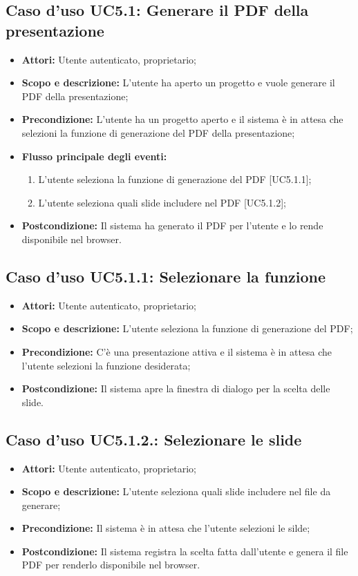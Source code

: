 	\subsection{Caso d'uso UC5.1: Generare il PDF della presentazione}
	\begin{itemize}
		\item \textbf{Attori:} Utente autenticato, proprietario;
		\item \textbf{Scopo e descrizione:} L'utente ha aperto un progetto e vuole generare il PDF della presentazione;
		\item \textbf{Precondizione:} L'utente ha un progetto aperto e il sistema è in attesa che selezioni la funzione di generazione del PDF della presentazione;
		\item \textbf{Flusso principale degli eventi:}
		\begin{enumerate}
			\item L'utente seleziona la funzione di generazione del PDF [UC5.1.1];
			\item L'utente seleziona quali slide includere nel PDF [UC5.1.2];
		\end{enumerate}
		\item \textbf{Postcondizione:} Il sistema ha generato il PDF per l'utente e lo rende disponibile nel browser.
	\end{itemize}
	
	
		\subsection{Caso d'uso UC5.1.1: Selezionare la funzione}
		\begin{itemize}
			\item \textbf{Attori:} Utente autenticato, proprietario;
			\item \textbf{Scopo e descrizione:} L'utente seleziona la funzione di generazione del PDF;
			\item \textbf{Precondizione:} C'è una presentazione attiva e il sistema è in attesa che l'utente selezioni la funzione desiderata;
			\item \textbf{Postcondizione:} Il sistema apre la finestra di dialogo per la scelta delle slide.
		\end{itemize}
		
		\subsection{Caso d'uso UC5.1.2.: Selezionare le slide}
		\begin{itemize}
			\item \textbf{Attori:} Utente autenticato, proprietario;
			\item \textbf{Scopo e descrizione:} L'utente seleziona quali slide includere nel file da generare;
			\item \textbf{Precondizione:} Il sistema è in attesa che l'utente selezioni le silde;
			\item \textbf{Postcondizione:} Il sistema registra la scelta fatta dall'utente e genera il file PDF per renderlo disponibile nel browser.
		\end{itemize}


